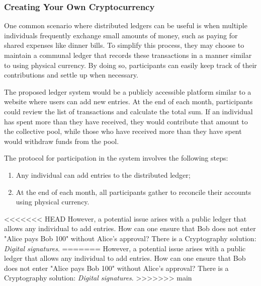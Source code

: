 \subsubsection{Creating Your Own Cryptocurrency}
One common scenario where distributed ledgers can be useful is when multiple individuals frequently exchange small amounts of money, such as paying for shared expenses like dinner bills. To simplify this process, they may choose to maintain a communal ledger that records these transactions in a manner similar to using physical currency. By doing so, participants can easily keep track of their contributions and settle up when necessary.

%

The proposed ledger system would be a publicly accessible platform similar to a website where users can add new entries. At the end of each month, participants could review the list of transactions and calculate the total sum. If an individual has spent more than they have received, they would contribute that amount to the collective pool, while those who have received more than they have spent would withdraw funds from the pool.

The protocol for participation in the system involves the following steps:

\begin{enumerate}
    \item Any individual can add entries to the distributed ledger;
    \item At the end of each month, all participants gather to reconcile their accounts using physical currency.
\end{enumerate}

<<<<<<< HEAD
However, a potential issue arises with a public ledger that allows any individual to add entries. How can one ensure that Bob does not enter "Alice pays Bob 100" without Alice's approval? There is a Cryptography solution: \emph{Digital signatures}.
=======
However, a potential issue arises with a public ledger that allows any individual to add entries. How can one ensure that
Bob does not enter "Alice pays Bob 100" without Alice's approval? There is a Cryptography solution: \emph{Digital signatures}.
>>>>>>> main
